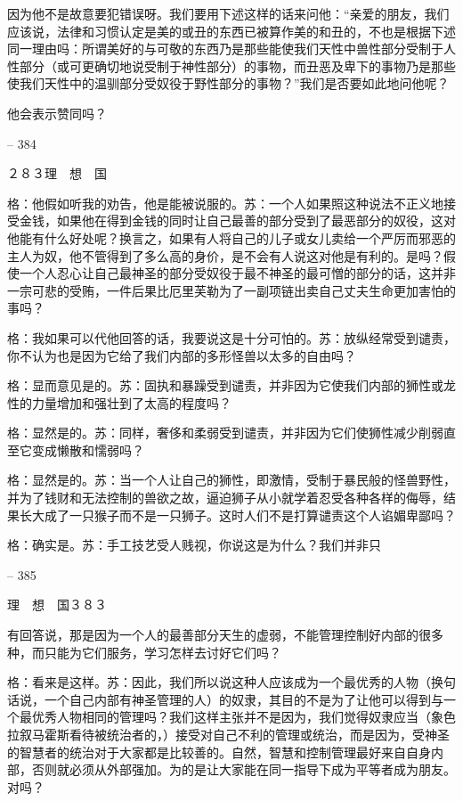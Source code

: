 \documentclass[11pt,oneside]{book}
\begin{document}
\begin{common-format}
    因为他不是故意要犯错误呀。我们要用下述这样的话来问他：“亲爱的朋友，我们应该说，法律和习惯认定是美的或丑的东西已被算作美的和丑的，不也是根据下述同一理由吗：所谓美好的与可敬的东西乃是那些能使我们天性中兽性部分受制于人性部分（或可更确切地说受制于神性部分）的事物，而丑恶及卑下的事物乃是那些使我们天性中的温驯部分受奴役于野性部分的事物？”我们是否要如此地问他呢？

    他会表示赞同吗？

    

-- 384

    ２８３理　想　国

    格：他假如听我的劝告，他是能被说服的。苏：一个人如果照这种说法不正义地接受金钱，如果他在得到金钱的同时让自己最善的部分受到了最恶部分的奴役，这对他能有什么好处呢？换言之，如果有人将自己的儿子或女儿卖给一个严厉而邪恶的主人为奴，他不管得到了多么高的身价，是不会有人说这对他是有利的。是吗？假使一个人忍心让自己最神圣的部分受奴役于最不神圣的最可憎的部分的话，这并非一宗可悲的受贿，一件后果比厄里芙勒为了一副项链出卖自己丈夫生命更加害怕的事吗？

    格：我如果可以代他回答的话，我要说这是十分可怕的。苏：放纵经常受到谴责，你不认为也是因为它给了我们内部的多形怪兽以太多的自由吗？

    格：显而意见是的。苏：固执和暴躁受到谴责，并非因为它使我们内部的狮性或龙性的力量增加和强壮到了太高的程度吗？

    格：显然是的。苏：同样，奢侈和柔弱受到谴责，并非因为它们使狮性减少削弱直至它变成懒散和懦弱吗？

    格：显然是的。苏：当一个人让自己的狮性，即激情，受制于暴民般的怪兽野性，并为了钱财和无法控制的兽欲之故，逼迫狮子从小就学着忍受各种各样的侮辱，结果长大成了一只猴子而不是一只狮子。这时人们不是打算谴责这个人谄媚卑鄙吗？

    格：确实是。苏：手工技艺受人贱视，你说这是为什么？我们并非只

    

-- 385

    理　想　国３８３

    有回答说，那是因为一个人的最善部分天生的虚弱，不能管理控制好内部的很多种，而只能为它们服务，学习怎样去讨好它们吗？

    格：看来是这样。苏：因此，我们所以说这种人应该成为一个最优秀的人物（换句话说，一个自己内部有神圣管理的人）的奴隶，其目的不是为了让他可以得到与一个最优秀人物相同的管理吗？我们这样主张并不是因为，我们觉得奴隶应当（象色拉叙马霍斯看待被统治者的，）接受对自己不利的管理或统治，而是因为，受神圣的智慧者的统治对于大家都是比较善的。自然，智慧和控制管理最好来自自身内部，否则就必须从外部强加。为的是让大家能在同一指导下成为平等者成为朋友。对吗？


\end{common-format}
\end{document}
